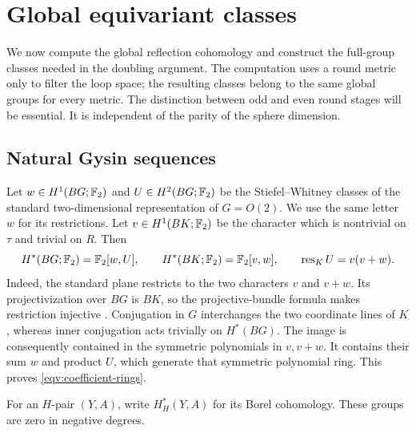 \section{Global equivariant classes}
\label{sec:equivariant}

We now compute the global reflection cohomology and construct the
full-group classes needed in the doubling argument.
The computation uses a round metric only to filter the loop space;
the resulting classes belong to the same global groups for every
metric.  The distinction between odd and even round stages will be
essential.  It is independent of the parity of the sphere dimension.

\subsection{Natural Gysin sequences}

Let \(w\in H^1(BG;\mathbb F_2)\) and \(U\in H^2(BG;\mathbb F_2)\) be the
Stiefel--Whitney classes of the standard two-dimensional representation
of \(G=O(2)\).  We use the same letter \(w\) for its restrictions.
Let \(v\in H^1(BK;\mathbb F_2)\) be the character which is nontrivial on
\(\tau\) and trivial on \(R\).  Then
\begin{equation}
 H^*(BG;\mathbb F_2)=\mathbb F_2[w,U],\qquad
 H^*(BK;\mathbb F_2)=\mathbb F_2[v,w],\qquad
 \operatorname{res}_K U=v(v+w).
 \label{eqv:coefficient-rings}
\end{equation}
Indeed, the standard plane restricts to the two characters \(v\) and
\(v+w\).  Its projectivization over \(BG\) is \(BK\), so the
projective-bundle formula makes restriction injective
\cite[Section~3.1, pp.~78--79]{HatcherVBKT2017}.  Conjugation
in \(G\) interchanges the two coordinate lines of \(K\), whereas inner
conjugation acts trivially on \(H^*(BG)\).  The image is consequently
contained in the symmetric polynomials in \(v,v+w\).  It contains their
sum \(w\) and product \(U\), which generate that symmetric polynomial
ring.  This proves \eqref{eqv:coefficient-rings}.

For an \(H\)-pair \((Y,A)\), write \(H_H^*(Y,A)\) for its Borel
cohomology.  These groups are zero in negative degrees.

